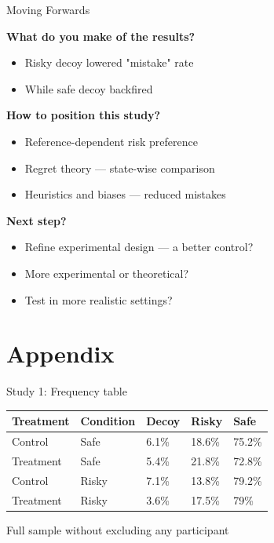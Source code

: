 \documentclass[
  ignorenonframetext,
  aspectratio=169]{beamer}
\begin{document}
\begin{frame}{Moving Forwards}
\label{moving-forwards}
\pause
\begin{flushleft}
  \textbf{What do you make of the results?}
\end{flushleft}
\begin{itemize}
  \item Risky decoy lowered "mistake" rate
  \item While safe decoy backfired
\end{itemize}

\pause
\begin{flushleft}
  \textbf{How to position this study?}
\end{flushleft}
\begin{itemize}
  \item Reference-dependent risk preference
  \item Regret theory — state-wise comparison
  \item Heuristics and biases — reduced mistakes
\end{itemize}

\pause
\begin{flushleft}
  \textbf{Next step?}
\end{flushleft}
\begin{itemize}
  \item Refine experimental design — a better control?
  \item More experimental or theoretical?
  \item Test in more realistic settings?
\end{itemize}
\end{frame}

\section{Appendix}\label{appendix}

\begin{frame}{Study 1: Frequency table}
\label{study-1-frequency-table}
\begin{table}
\centering
\begin{tabular}{lllll}
\toprule
Treatment & Condition & Decoy & Risky & Safe\\
\midrule
Control & Safe & 6.1\% & 18.6\% & 75.2\%\\
Treatment & Safe & 5.4\% & 21.8\% & 72.8\%\\
Control & Risky & 7.1\% & 13.8\% & 79.2\%\\
Treatment & Risky & 3.6\% & 17.5\% & 79\%\\
\bottomrule
\end{tabular}
\end{table}

\vfill

\hfill \tiny *Full sample without excluding any participant
\end{frame}
\end{document}
